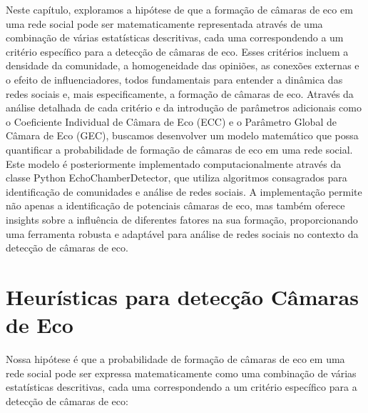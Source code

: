 Neste capítulo, exploramos a hipótese de que a formação de câmaras de eco em uma rede social pode ser matematicamente representada através de uma combinação de várias estatísticas descritivas, cada uma correspondendo a um critério específico para a detecção de câmaras de eco. Esses critérios incluem a densidade da comunidade, a homogeneidade das opiniões, as conexões externas e o efeito de influenciadores, todos fundamentais para entender a dinâmica das redes sociais e, mais especificamente, a formação de câmaras de eco. Através da análise detalhada de cada critério e da introdução de parâmetros adicionais como o Coeficiente Individual de Câmara de Eco (ECC) e o Parâmetro Global de Câmara de Eco (GEC), buscamos desenvolver um modelo matemático que possa quantificar a probabilidade de formação de câmaras de eco em uma rede social. Este modelo é posteriormente implementado computacionalmente através da classe Python EchoChamberDetector, que utiliza algoritmos consagrados para identificação de comunidades e análise de redes sociais. A implementação permite não apenas a identificação de potenciais câmaras de eco, mas também oferece insights sobre a influência de diferentes fatores na sua formação, proporcionando uma ferramenta robusta e adaptável para análise de redes sociais no contexto da detecção de câmaras de eco.

\section{Heurísticas para detecção Câmaras de Eco}

Nossa hipótese é que a probabilidade de formação de câmaras de eco em uma rede social pode ser expressa matematicamente como uma combinação de várias estatísticas descritivas, cada uma correspondendo a um critério específico para a detecção de câmaras de eco:

